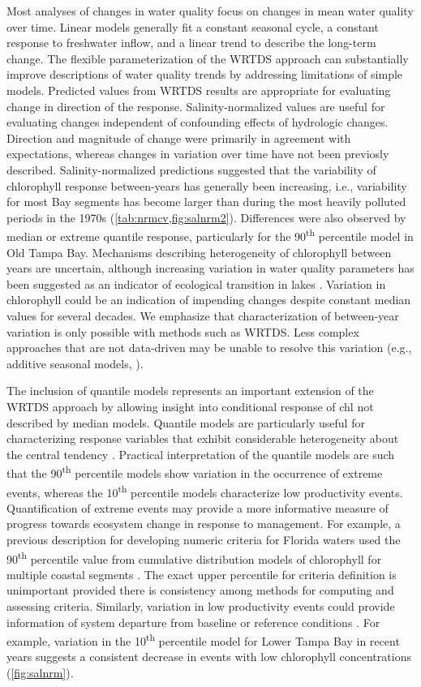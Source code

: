 \documentclass{svjour3}\usepackage[]{graphicx}\usepackage[]{color}
\newcommand{\nine}{90\textsuperscript{th} percentile }
\newcommand{\ten}{10\textsuperscript{th} percentile }
\begin{document}
Most analyses of changes in water quality focus on changes in mean water quality over time.  Linear models generally fit a constant seasonal cycle, a constant response to freshwater inflow, and a linear trend to describe the long-term change.  The flexible parameterization of the \ac{WRTDS} approach can substantially improve descriptions of water quality trends by addressing limitations of simple models.  Predicted values from \ac{WRTDS} results are appropriate for evaluating change in direction of the response. Salinity-normalized values are useful for evaluating changes independent of confounding effects of hydrologic changes.  Direction and magnitude of change were primarily in agreement with expectations, whereas changes in variation over time have not been previosly described.  Salinity-normalized predictions suggested that the variability of chlorophyll response between-years has generally been increasing, i.e., variability for most Bay segments has become larger than during the most heavily polluted periods in the 1970s (\cref{tab:nrmcv,fig:salnrm2}).  Differences were also observed by median or extreme quantile response, particularly for the \nine model in Old Tampa Bay.  Mechanisms describing heterogeneity of chlorophyll between years are uncertain, although increasing variation in water quality parameters has been suggested as an indicator of ecological transition in lakes \cite{Carpenter06}.   Variation in chlorophyll could be an indication of impending changes despite constant median values for several decades.  We emphasize that characterization of between-year variation is only possible with methods such as \ac{WRTDS}.  Less complex approaches that are not data-driven may be unable to resolve this variation (e.g., additive seasonal models, \cite{Cloern10}).     

The inclusion of quantile models represents an important extension of the \ac{WRTDS} approach by allowing insight into conditional response of \ac{chl} not described by median models.  Quantile models are particularly useful for characterizing response variables that exhibit considerable heterogeneity about the central tendency \cite{Terrell96,Cade03}.  Practical interpretation of the quantile models are such that the \nine models show variation in the occurrence of extreme events, whereas the \ten models characterize low productivity events.  Quantification of extreme events may provide a more informative measure of progress towards ecosystem change in response to management.  For example, a previous description for developing numeric criteria for Florida waters used the \nine value from cumulative distribution models of chlorophyll for multiple coastal segments \cite{Schaeffer12}.  The exact upper percentile for criteria definition is unimportant provided there is consistency among methods for computing and assessing criteria.  Similarly, variation in low productivity events could provide information of system departure from baseline or reference conditions \cite{Stoddard06}. For example, variation in the \ten model for Lower Tampa Bay in recent years suggests a consistent decrease in events with low chlorophyll concentrations (\cref{fig:salnrm}).
\end{document}
